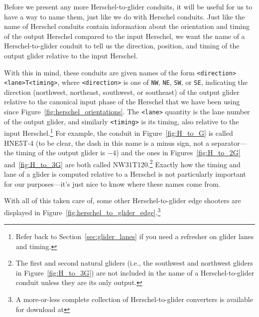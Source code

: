 Before we present any more Herschel-to-glider conduits, it will be useful for us to have a way to name them, just like we do with Herschel conduits. Just like the name of Herschel conduits contain information about the orientation and timing of the output Herschel compared to the input Herschel, we want the name of a Herschel-to-glider conduit to tell us the direction, position, and timing of the output glider relative to the input Herschel.

With this in mind, these conduits are given names of the form \verb|<direction><lane>T<timing>|, where \verb|<direction>| is one of \verb|NW|, \verb|NE|, \verb|SW|, or \verb|SE|, indicating the direction (northwest, northeast, southwest, or southeast) of the output glider relative to the canonical input phase of the Herschel that we have been using since Figure~\ref{fig:herschel_orientations}. The \verb|<lane>| quantity is the lane number of the output glider, and similarly \verb|<timing>| is its timing, also relative to the input Herschel.\footnote{Refer back to Section~\ref{sec:glider_lanes} if you need a refresher on glider lanes and timing.} For example, the conduit in Figure~\ref{fig:H_to_G} is called HNE5T-4 (to be clear, the dash in this name is a minus sign, not a separator---the timing of the output glider is $-4$) and the ones in Figures~\ref{fig:H_to_2G} and~\ref{fig:H_to_3G} are both called NW31T120.\footnote{The first and second natural gliders (i.e., the southwest and northwest gliders in Figure~\ref{fig:H_to_3G}) are not included in the name of a Herschel-to-glider conduit unless they are its only output.} Exactly how the timing and lane of a glider is computed relative to a Herschel is not particularly important for our purposes---it's just nice to know where these names come from.

With all of this taken care of, some other Herschel-to-glider edge shooters are displayed in Figure~\ref{fig:herschel_to_glider_edge}.\footnote{A more-or-less complete collection of Herschel-to-glider converters is available for download at }

